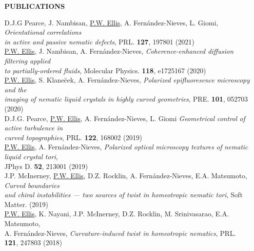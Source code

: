 \documentclass[10pt]{article}
\newenvironment{changemargin}[2]{%
  \list{}{\rightmargin#2\leftmargin#1
    \parsep=0pt\topsep=1pt\partopsep=0pt}
\item[]} {\endlist}
\newenvironment{indentmore}{\begin{changemargin}{10pt}{0cm}}{\end{changemargin}}
\begin{document}
\vspace{10pt}
\textbf{\large PUBLICATIONS}
\begin{indentmore}
D.J.G Pearce, J. Nambisan, \underline{P.W. Ellis},  A. Fern\'{a}ndez-Nieves, L. Giomi, \emph{Orientational correlations \\ \hspace*{15pt} in active and passive nematic defects}, PRL. {\bf 127}, 197801 (2021)\\

\underline{P.W. Ellis}, J. Nambisan, A. Fern\'{a}ndez-Nieves, \emph{Coherence-enhanced diffusion filtering applied \\ \hspace*{15pt} to partially-ordered fluids}, Molecular Physics. {\bf 118}, e1725167 (2020)\\

\underline{P.W. Ellis}, S. Klane\u{c}ek, A. Fern\'{a}ndez-Nieves, \emph{Polarized epifluoresence microscopy and the \\ \hspace*{15pt} imaging of nematic liquid crystals in highly curved geometries}, PRE. {\bf 101}, 052703 (2020)\\

D.J.G. Pearce, \underline{P.W. Ellis}, A. Fern\'{a}ndez-Nieves, L. Giomi \emph{Geometrical control of active turbulence in \\ \hspace*{15pt} curved topographies}, PRL. {\bf 122}, 168002 (2019)\\

\underline{P.W. Ellis}, A. Fern\'{a}ndez-Nieves, \emph{Polarized optical microscopy textures of nematic liquid crystal tori}, \\ \hspace*{15pt} JPhys D. {\bf 52}, 213001 (2019)\\

J.P. McInerney, \underline{P.W. Ellis}, D.Z. Rocklin, A. Fern\'{a}ndez-Nieves, E.A. Matsumoto, \emph{Curved boundaries \\ \hspace*{15pt} and chiral instabilities --- two sources of twist in homeotropic nematic tori}, Soft Matter. (2019) \\

\underline{P.W. Ellis}, K. Nayani, J.P. McInerney, D.Z. Rocklin, M. Srinivasarao, E.A. Matsumoto, \\ \hspace*{15pt} A. Fern\'{a}ndez-Nieves, \emph{Curvature-induced twist in homeotropic nematics}, PRL. {\bf 121}, 247803 (2018) \\


\end{indentmore}
\end{document}
